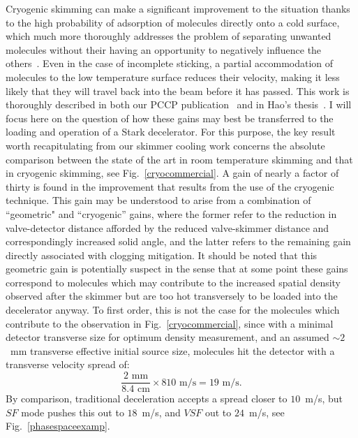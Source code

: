 Cryogenic skimming can make a significant improvement to the situation thanks to the high probability of adsorption of molecules directly onto a cold surface, which much more thoroughly addresses the problem of separating unwanted molecules without their having an opportunity to negatively influence the others~\cite{Segev2017}.
Even in the case of incomplete sticking, a partial accommodation of molecules to the low temperature surface reduces their velocity, making it less likely that they will travel back into the beam before it has passed.
This work is thoroughly described in both our PCCP publication~\cite{Wu2018} and in Hao's thesis~\citep[Chap.~5]{WuThesis2019}.
I will focus here on the question of how these gains may best be transferred to the loading and operation of a Stark decelerator.
For this purpose, the key result worth recapitulating from our skimmer cooling work concerns the absolute comparison between the state of the art in room temperature skimming and that in cryogenic skimming, see Fig.~\ref{cryocommercial}.
A gain of nearly a factor of thirty is found in the improvement that results from the use of the cryogenic technique.
This gain may be understood to arise from a combination of ``geometric" and ``cryogenic'' gains, where the former refer to the reduction in valve-detector distance afforded by the reduced valve-skimmer distance and correspondingly increased solid angle, and the latter refers to the remaining gain directly associated with clogging mitigation.
It should be noted that this geometric gain is potentially suspect in the sense that at some point these gains correspond to molecules which may contribute to the increased spatial density observed after the skimmer but are too hot transversely to be loaded into the decelerator anyway.
To first order, this is not the case for the molecules which contribute to the observation in Fig.~\ref{cryocommercial}, since with a minimal detector transverse size for optimum density measurement, and an assumed $\sim\!2$~mm transverse effective initial source size, molecules hit the detector with a transverse velocity spread of:
\begin{equation}
\frac{2\text{ mm}}{8.4\text{ cm}}\times810\text{ m/s} = 19\text{ m/s}.
\end{equation}
By comparison, traditional deceleration accepts a spread closer to $10$~m/s, but $SF$ mode pushes this out to $18$~m/s, and $VSF$ out to $24$~m/s, see Fig.~\ref{phasespaceexamp}.


